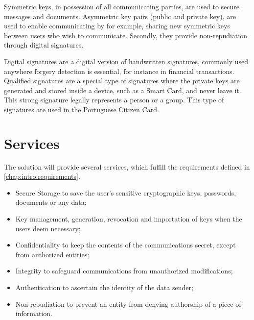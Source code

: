 Symmetric keys, in possession of all communicating parties, are used to secure messages and documents.
Asymmetric key pairs (public and private key), are used to enable communicating by for example, sharing new symmetric keys between users who wish to communicate. Secondly, they provide non-repudiation through digital signatures.

Digital signatures are a digital version of handwritten signatures, commonly used anywhere forgery detection is essential, for instance in financial transactions.
Qualified signatures are a special type of signatures where the private keys are generated and stored inside a device, such as a Smart Card, and never leave it.
This strong signature legally represents a person or a group. This type of signatures are used in the Portuguese Citizen Card.

\section{Services} \label{chap:problem:services}


The solution will provide several services, which fulfill the requirements defined in \ref{chap:intro:requirements}.

\begin{itemize}
    \item Secure Storage to save the user's sensitive cryptographic keys, passwords, documents or any data;
    \item Key management, generation, revocation and importation of keys when the users deem necessary;
    \item Confidentiality to keep the contents of the communications secret, except from authorized entities;
    \item Integrity to safeguard communications from unauthorized modifications;
    \item Authentication to ascertain the identity of the data sender;
    \item Non-repudiation to prevent an entity from denying authorship of a piece of information.
\end{itemize}
